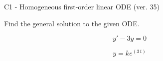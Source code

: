 \begin{exercise}
  \begin{exerciseTitle}C1 - Homogeneous first-order linear ODE (ver. 35)\end{exerciseTitle}
  \begin{exerciseStatement}
    
Find the general solution to the given ODE.

    
\[y'-3y=0\]

  \end{exerciseStatement}
  \begin{exerciseAnswer}
    
\[y= k e^{\left(3 \, t\right)}\]

  \end{exerciseAnswer}
\end{exercise}